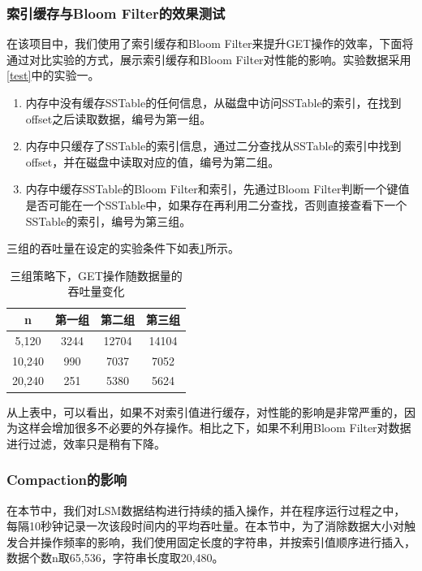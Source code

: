 \documentclass{article}
\begin{document}
\subsubsection{索引缓存与Bloom Filter的效果测试}

在该项目中，我们使用了索引缓存和Bloom Filter来提升GET操作的效率，下面将通过对比实验的方式，展示索引缓存和Bloom Filter对性能的影响。实验数据采用\ref{test}中的实验一。

\begin{enumerate}
    \item 内存中没有缓存SSTable的任何信息，从磁盘中访问SSTable的索引，在找到offset之后读取数据，编号为第一组。
    \item 内存中只缓存了SSTable的索引信息，通过二分查找从SSTable的索引中找到offset，并在磁盘中读取对应的值，编号为第二组。
    \item 内存中缓存SSTable的Bloom Filter和索引，先通过Bloom Filter判断一个键值是否可能在一个SSTable中，如果存在再利用二分查找，否则直接查看下一个SSTable的索引，编号为第三组。
\end{enumerate}

三组的吞吐量在设定的实验条件下如表\ref{tab:3}所示。

\begin{table}[ht]
\caption{三组策略下，GET操作随数据量的吞吐量变化}
\label{tab:3}
\begin{center}
	\begin{tabular}{c | c | c | c}
		\hline
		n & 第一组 & 第二组 & 第三组 \\
		\hline\hline
		5,120 & 3244 & 12704 & 14104 \\
		10,240 & 990 & 7037 & 7052 \\
		20,240 & 251 & 5380 & 5624 \\
		\hline
	\end{tabular}
\end{center}
\end{table}

从上表中，可以看出，如果不对索引值进行缓存，对性能的影响是非常严重的，因为这样会增加很多不必要的外存操作。相比之下，如果不利用Bloom Filter对数据进行过滤，效率只是稍有下降。

\subsubsection{Compaction的影响}
在本节中，我们对LSM数据结构进行持续的插入操作，并在程序运行过程之中，每隔10秒钟记录一次该段时间内的平均吞吐量。在本节中，为了消除数据大小对触发合并操作频率的影响，我们使用固定长度的字符串，并按索引值顺序进行插入，数据个数n取65,536，字符串长度取20,480。
\end{document}
